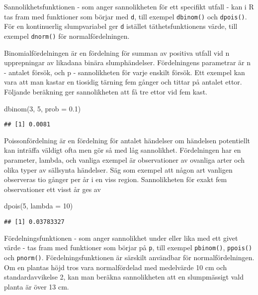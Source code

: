 \documentclass[
]{book}
\newenvironment{Shaded}{\begin{snugshade}}{\end{snugshade}}
\newcommand{\AttributeTok}[1]{\textcolor[rgb]{0.77,0.63,0.00}{#1}}
\newcommand{\DecValTok}[1]{\textcolor[rgb]{0.00,0.00,0.81}{#1}}
\newcommand{\FloatTok}[1]{\textcolor[rgb]{0.00,0.00,0.81}{#1}}
\newcommand{\FunctionTok}[1]{\textcolor[rgb]{0.00,0.00,0.00}{#1}}
\newcommand{\NormalTok}[1]{#1}
\theoremstyle{definition}
\theoremstyle{definition}
\theoremstyle{definition}
\theoremstyle{definition}
\theoremstyle{remark}
\begin{document}
Sannolikhetsfunktionen - som anger sannolikheten för ett specifikt utfall - kan i R tas fram med funktioner som börjar med \texttt{d}, till exempel \texttt{dbinom()} och \texttt{dpois()}. För en kontinuerlig slumpvariabel ger \texttt{d} istället täthetsfunktionens värde, till exempel \texttt{dnorm()} för normalfördelningen.

Binomialfördelningen är en fördelning för summan av positiva utfall vid n upprepningar av likadana binära slumphändelser. Fördelningens parametrar är n - antalet försök, och p - sannolikheten för varje enskilt försök. Ett exempel kan vara att man kastar en tiosidig tärning fem gånger och tittar på antalet ettor. Följande beräkning ger sannolikheten att få tre ettor vid fem kast.

\begin{Shaded}
\begin{Highlighting}[]
\FunctionTok{dbinom}\NormalTok{(}\DecValTok{3}\NormalTok{, }\DecValTok{5}\NormalTok{, }\AttributeTok{prob =} \FloatTok{0.1}\NormalTok{)}
\end{Highlighting}
\end{Shaded}

\begin{verbatim}
## [1] 0.0081
\end{verbatim}

Poissonfördelning är en fördelning för antalet händelser om händelsen potentiellt kan inträffa väldigt ofta men gör så med låg sannolikhet. Fördelningen har en parameter, lambda, och vanliga exempel är observationer av ovanliga arter och olika typer av sällsynta händelser. Säg som exempel att någon art vanligen observeras tio gånger per år i en viss region. Sannolikheten för exakt fem observationer ett visst år ges av

\begin{Shaded}
\begin{Highlighting}[]
\FunctionTok{dpois}\NormalTok{(}\DecValTok{5}\NormalTok{, }\AttributeTok{lambda =} \DecValTok{10}\NormalTok{)}
\end{Highlighting}
\end{Shaded}

\begin{verbatim}
## [1] 0.03783327
\end{verbatim}

Fördelningsfunktionen - som anger sannolikhet under eller lika med ett givet värde - tas fram med funktioner som börjar på \texttt{p}, till exempel \texttt{pbinom()}, \texttt{ppois()} och \texttt{pnorm()}. Fördelningsfunktionen är särskilt användbar för normalfördelningen. Om en plantas höjd tros vara normalfördelad med medelvärde 10 cm och standardavvikelse 2, kan man beräkna sannolikheten att en slumpmässigt vald planta är över 13 cm.
\end{document}
